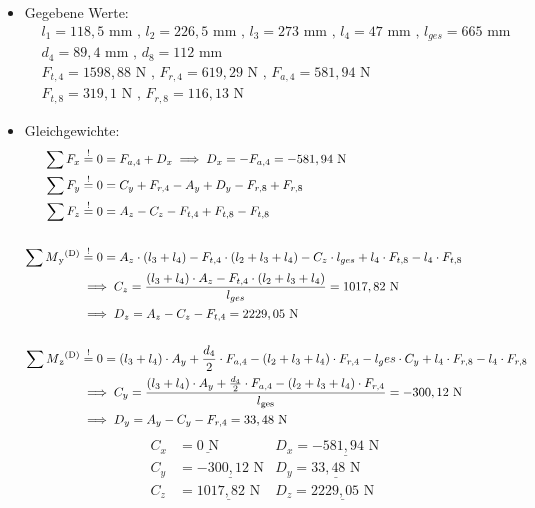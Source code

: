 \begin{itemize}
	\item Gegebene Werte: 
	\begin{align*}
	&l_{1} =118,5\text{ mm} \text{ , } l_{2} = 226,5\text{ mm} \text{ , } l_{3} = 273 \text{ mm} \text{ , } l_{4} = 47\text{ mm} \text{ , } l_{ges} = 665\text{ mm} \\
	&d_4 = 89,4\text{ mm} \text{ , } d_8 = 112 \text{ mm} \\
	&F_{t,4} = 1598,88 \text{ N} \text{ , } F_{r,4}  = 619,29\text{ N} \text{ , } F_{a,4} = 581,94 \text{ N} \\
	&F_{t,8} = 319,1 \text{ N} \text{ , } F_{r,8}  = 116,13\text{ N}
\end{align*}
	\item Gleichgewichte:
\begin{align*}
    \sum F_x &\overset{!}{=} 0 = F_{a,4} + D_x \implies D_x = -F_{a,4} = -581,94 \text{ N} \\
    \sum F_y &\overset{!}{=} 0 = C_y + F_{r,4}-A_y +D_y - F_{r,8} + F_{r,8}\\ 
    \sum F_z &\overset{!}{=} 0 = A_z - C_z - F_{t,4} + F_{t,8} - F_{t,8}\\ \\
    \sum M\textsubscript{y}\textsuperscript{(D)} &\overset{!}{=} 0 = A_z \cdot (l_3+l_4)- F_{t,4} \cdot (l_2+l_3+l_4) - C_z \cdot l_{ges} +l_4 \cdot F_{t,8}- l_4 \cdot F_{t,8} \\ 
    &\implies C_z = \frac{(l_3+l_4) \cdot A_z - F_{t,4} \cdot (l_2+l_3+l_4)}{l_{ges}} = 1017,82 \text { N} \\ 
    & \implies D_z = A_z - C_z - F_{t,4}= 2229,05 \text{ N}\\ \\
    \sum M\textsubscript{z}\textsuperscript{(D)} &\overset{!}{=} 0 = (l_3+l_4) \cdot A_y + \frac{d_4}{2} \cdot F_{a,4} - (l_2+l_3+l_4) \cdot F_{r,4}- l_ges \cdot C_y +l_4 \cdot F_{r,8} -l_4 \cdot F_{r,8} \\ 
    &\implies C_y = \frac{(l_3+l_4) \cdot A_y + \frac{d_4}{2} \cdot F_{a,4} - (l_2+l_3+l_4) \cdot F_{r,4}}{l\textsubscript{ges}} = -300,12 \text{ N}\\ 
    & \implies D_y =   A_y - C_y - F_{r,4} =  33,48\text{ N}\\ 
\end{align*}
\begin{align*}
    C_x &= \underline{0\text{ N}} & D_x= \underline{-581,94\text{ N}}\\
    C_y &= \underline{-300,12\text{ N}} & D_y= \underline{33,48\text{ N}}\\
    C_z &= \underline{1017,82\text{ N}} & D_z= \underline{2229,05\text{ N}}\\
\end{align*}
\end{itemize}
\newpage
